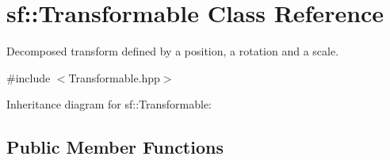\hypertarget{classsf_1_1_transformable}{}\section{sf\+:\+:Transformable Class Reference}
\label{classsf_1_1_transformable}


Decomposed transform defined by a position, a rotation and a scale.  




{\ttfamily \#include $<$Transformable.\+hpp$>$}



Inheritance diagram for sf\+:\+:Transformable\+:
\subsection*{Public Member Functions}
